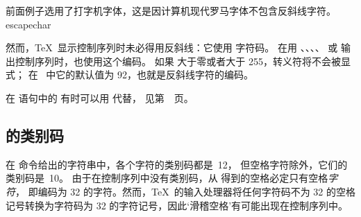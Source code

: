\documentclass{book}
\begin{document}
前面例子选用了打字机字体，这是因计算机现代罗马字体不包含反斜线字符。
\cstoidx escapechar\par
然而，\TeX\ 显示控制序列时未必得用反斜线：它使用  字符码。
在用 、、、、
 或  输出控制序列时，也使用这个编码。
如果  大于零或者大于 255，转义符将不会被显式；
在 \IniTeX\ 中它的默认值为 92，也就是反斜线字符的编码。

在  语句中的  有时可以用  代替，
见第~\pageref{expand:write}~页。

\subsection{ 的类别码}

在  命令给出的字符串中，各个字符的类别码都是~12，
但空格字符除外，它们的类别码是~10。
由于在控制序列中没有类别码，从  得到的空格必定只有空格{\em 字符}，
即编码为 32 的字符。然而，\TeX\ 的输入处理器将任何字符码不为 32
的空格记号转换为字符码为 32 的字符记号，因此`滑稽空格'有可能出现在控制序列中。
\end{document}
